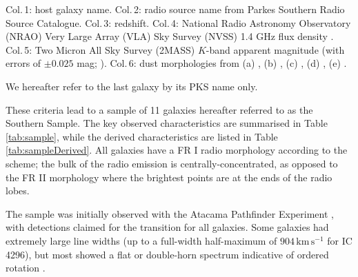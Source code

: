 \begin{table}
\begin{threeparttable}
		\begin{tablenotes}
		\footnotesize
		\note Col.\,1: host galaxy name. Col.\,2: radio source name from Parkes Southern Radio Source Catalogue. Col.\,3: redshift. Col.\,4: National Radio Astronomy Observatory (NRAO) Very Large Array (VLA) Sky Survey (NVSS) 1.4 GHz flux density \citep{Condon1998}. Col.\,5: Two Micron All Sky Survey (2MASS) $K$-band apparent magnitude (with errors of $\pm 0.025$ mag; \citealt{Skrutskie2006}). Col.\,6: dust morphologies from (a) \citet{Govoni2000}, (b) \citet{Lauer2005}, (c) \citet{Bettoni2001}, (d) \citet{Sandage1979}, (e) \citet{Colbert2001}. 
		\item We hereafter refer to the last galaxy by its PKS name only.
		\end{tablenotes}
	\end{threeparttable}
	\end{table}

	These criteria lead to a sample of 11 galaxies hereafter referred to as the Southern Sample. The key observed characteristics are summarised in Table \ref{tab:sample}, while the derived characteristics are listed in Table \ref{tab:sampleDerived}. All galaxies have a FR I radio morphology according to the \citet{Fanaroff1974} scheme; the bulk of the radio emission is centrally-concentrated, as opposed to the FR II morphology where the brightest points are at the ends of the radio lobes. 
	
	The sample was initially observed with the Atacama Pathfinder Experiment \citep[APEX; ][]{Gusten2006}, with detections claimed for the  transition for all galaxies. Some galaxies had extremely large line widths (up to a full-width half-maximum of $904 \, \mathrm{km \, s^{-1}}$ for IC 4296), but most showed a flat or double-horn spectrum indicative of ordered rotation \citep{Prandoni2012}.

